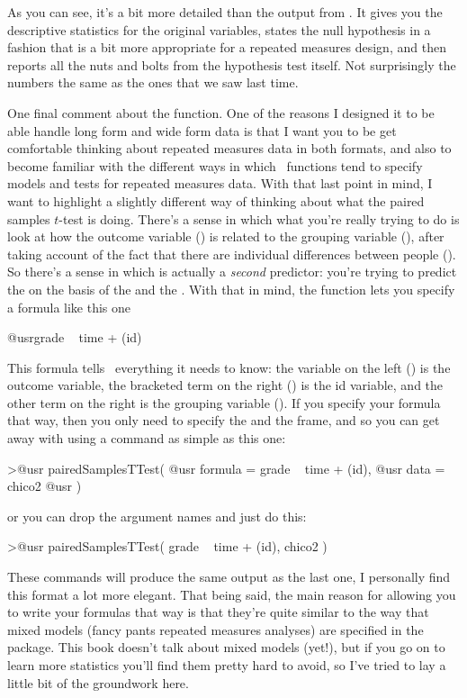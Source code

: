 As you can see, it's a bit more detailed than the output from . It gives you the descriptive statistics for the original variables, states the null hypothesis in a fashion that is a bit more appropriate for a repeated measures design, and then reports all the nuts and bolts from the hypothesis test itself. Not surprisingly the numbers the same as the ones that we saw last time.

One final comment about the  function. One of the reasons I designed it to be able handle long form and wide form data is that I want you to be get comfortable thinking about repeated measures data in both formats, and also to become familiar with the different ways in which \R\ functions tend to specify models and tests for repeated measures data. With that last point in mind, I want to highlight a slightly different way of thinking about what the paired samples $t$-test is doing. There's a sense in which what you're really trying to do is look at how the outcome variable () is related to the grouping variable (), after taking account of the fact that there are individual differences between people (). So there's a sense in which  is actually a {\it second} predictor: you're trying to predict the  on the basis of the  and the . With that in mind, the  function lets you specify a formula like this one
\begin{rblock1}
@usr{grade ~ time + (id)}
\end{rblock1}
This formula tells \R\ everything it needs to know: the variable on the left () is the outcome variable, the bracketed term on the right () is the id variable, and the other term on the right is the grouping variable (). If you specify your formula that way, then you only need to specify the  and the  frame, and so you can get away with using a command as simple as this one:
\begin{rblock1}
>@usr{ pairedSamplesTTest(} 
 @usr{    formula = grade ~ time + (id),}
 @usr{    data = chico2}
 @usr{ )}
\end{rblock1}
or you can drop the argument names and just do this:
\begin{rblock1}
>@usr{ pairedSamplesTTest( grade ~ time + (id), chico2 )}
\end{rblock1}
These commands will produce the same output as the last one, I personally find this format a lot more elegant. That being said, the main reason for allowing you to write your formulas that way is that they're quite similar to the way that mixed models (fancy pants repeated measures analyses) are specified in the  package. This book doesn't talk about mixed models (yet!), but if you go on to learn more statistics you'll find them pretty hard to avoid, so I've tried to lay a little bit of the groundwork here.


